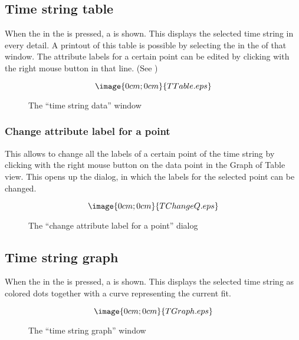 \subsection{Time string table}%
\label{timestring.table}
When the  in the 
is pressed, a
is shown. This displays the selected time string in every detail.
A printout of this table is possible by selecting the 
in the  of that window.
The attribute labels for a certain point can be edited by clicking with the 
right mouse button in that line. 
(See )

\begin{figure}[h]
$$\image{0cm;0cm}{TTable.eps}$$%
\caption{The ``time string data'' window}%
\label{timestring.table.window}
\end{figure}


\subsubsection{Change attribute label for a point}%
\label{timestring.changeattribute}
This allows to change all the labels of a certain point
of the time string by clicking with the right mouse button
on the data point in the Graph of Table view.
This opens up the 
dialog, in which the labels for the selected point can be changed.
\begin{figure}[h]
$$\image{0cm;0cm}{TChangeQ.eps}$$%
\caption{The ``change attribute label for a point'' dialog}%
\label{timestring.changeattribute.dialog}
\end{figure}


\subsection{Time string graph}%
\label{timestring.graph}
When the  in the 
is pressed, a
is shown. This displays the selected time string as
colored dots together with a curve representing the current fit.
\begin{figure}[h]
$$\image{0cm;0cm}{TGraph.eps}$$%
\caption{The ``time string graph'' window}%
\label{timestring.graph.window}
\end{figure}

